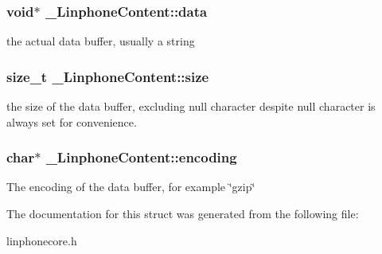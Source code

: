 \subsubsection[{data}]{\setlength{\rightskip}{0pt plus 5cm}void$\ast$ \-\_\-\-Linphone\-Content\-::data}\label{struct__LinphoneContent_a086b012e35d02be9c68c8f0fd4661f39}
the actual data buffer, usually a string 
\subsubsection[{size}]{\setlength{\rightskip}{0pt plus 5cm}size\-\_\-t \-\_\-\-Linphone\-Content\-::size}\label{struct__LinphoneContent_a6ea21723404888691dbe0aaa547ec4cb}
the size of the data buffer, excluding null character despite null character is always set for convenience. 
\subsubsection[{encoding}]{\setlength{\rightskip}{0pt plus 5cm}char$\ast$ \-\_\-\-Linphone\-Content\-::encoding}\label{struct__LinphoneContent_af4089d2498d3d310ac1d925e9a1d4c90}
The encoding of the data buffer, for example \char`\"{}gzip\char`\"{} 

The documentation for this struct was generated from the following file\-:\begin{DoxyCompactItemize}
\item 
linphonecore.\-h\end{DoxyCompactItemize}

